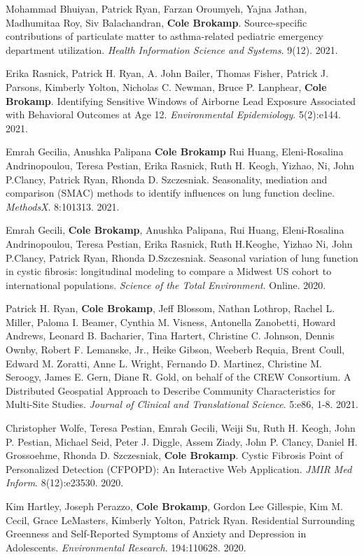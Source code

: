 Mohammad Bhuiyan, Patrick Ryan, Farzan Oroumyeh, Yajna Jathan,
Madhumitaa Roy, Siv Balachandran, \textbf{Cole Brokamp}. Source-specific
contributions of particulate matter to asthma-related pediatric
emergency department utilization. \emph{Health Information Science and
Systems}. 9(12). 2021.

Erika Rasnick, Patrick H. Ryan, A. John Bailer, Thomas Fisher, Patrick
J. Parsons, Kimberly Yolton, Nicholas C. Newman, Bruce P. Lanphear,
\textbf{Cole Brokamp}. Identifying Sensitive Windows of Airborne Lead
Exposure Associated with Behavioral Outcomes at Age 12.
\emph{Environmental Epidemiology}. 5(2):e144. 2021.

Emrah Gecilia, Anushka Palipana \textbf{Cole Brokamp} Rui Huang,
Eleni-Rosalina Andrinopoulou, Teresa Pestian, Erika Rasnick, Ruth H.
Keogh, Yizhao, Ni, John P.Clancy, Patrick Ryan, Rhonda D. Szczesniak.
Seasonality, mediation and comparison (SMAC) methods to identify
influences on lung function decline. \emph{MethodsX}. 8:101313. 2021.

Emrah Gecili, \textbf{Cole Brokamp}, Anushka Palipana, Rui Huang,
Eleni-Rosalina Andrinopoulou, Teresa Pestian, Erika Rasnick, Ruth
H.Keoghe, Yizhao Ni, John P.Clancy, Patrick Ryan, Rhonda D.Szczesniak.
Seasonal variation of lung function in cystic fibrosis: longitudinal
modeling to compare a Midwest US cohort to international populations.
\emph{Science of the Total Environment}. Online. 2020.

Patrick H. Ryan, \textbf{Cole Brokamp}, Jeff Blossom, Nathan Lothrop,
Rachel L. Miller, Paloma I. Beamer, Cynthia M. Visness, Antonella
Zanobetti, Howard Andrews, Leonard B. Bacharier, Tina Hartert, Christine
C. Johnson, Dennis Ownby, Robert F. Lemanske, Jr., Heike Gibson, Weeberb
Requia, Brent Coull, Edward M. Zoratti, Anne L. Wright, Fernando D.
Martinez, Christine M. Seroogy, James E. Gern, Diane R. Gold, on behalf
of the CREW Consortium. A Distributed Geospatial Approach to Describe
Community Characteristics for Multi-Site Studies. \emph{Journal of
Clinical and Translational Science}. 5:e86, 1-8. 2021.

Christopher Wolfe, Teresa Pestian, Emrah Gecili, Weiji Su, Ruth H.
Keogh, John P. Pestian, Michael Seid, Peter J. Diggle, Assem Ziady, John
P. Clancy, Daniel H. Grossoehme, Rhonda D. Szczesniak, \textbf{Cole
Brokamp}. Cystic Fibrosis Point of Personalized Detection (CFPOPD): An
Interactive Web Application. \emph{JMIR Med Inform}. 8(12):e23530. 2020.

Kim Hartley, Joseph Perazzo, \textbf{Cole Brokamp}, Gordon Lee
Gillespie, Kim M. Cecil, Grace LeMasters, Kimberly Yolton, Patrick Ryan.
Residential Surrounding Greenness and Self-Reported Symptoms of Anxiety
and Depression in Adolescents. \emph{Environmental Research}.
194:110628. 2020.

